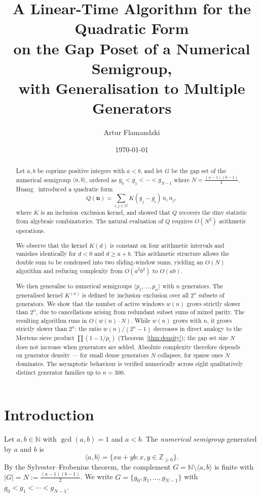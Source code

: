 \documentclass[11pt,a4paper]{amsart}
\title{A Linear-Time Algorithm for the Quadratic Form\\
on the Gap Poset of a Numerical Semigroup,\\
with Generalisation to Multiple Generators}
\author{Artur Flamandzki}
\date{\today}
\theoremstyle{plain}
\theoremstyle{definition}
\theoremstyle{remark}
\begin{document}
\begin{abstract}
Let $a, b$ be coprime positive integers with $a < b$, and let $G$ be the gap
set of the numerical semigroup $\langle a, b \rangle$, ordered as
$g_0 < g_1 < \cdots < g_{N-1}$ where $N = \tfrac{(a-1)(b-1)}{2}$.
Huang~\cite{Huang2026} introduced a quadratic form
\[
  Q(\mathbf{n}) = \sum_{i,j \in G} K(g_j - g_i)\, n_i\, n_j,
\]
where $K$ is an inclusion--exclusion kernel, and showed that $Q$ recovers
the $\mathrm{dinv}$ statistic from algebraic combinatorics.
The natural evaluation of $Q$ requires $O(N^2)$ arithmetic operations.

We observe that the kernel $K(d)$ is constant on four arithmetic intervals
and vanishes identically for $d < 0$ and $d \geq a+b$.
This arithmetic structure allows the double sum to be condensed into two
sliding-window sums, yielding an $O(N)$ algorithm and reducing complexity
from $O(a^2b^2)$ to $O(ab)$.

We then generalise to numerical semigroups $\langle p_1,\ldots,p_n\rangle$
with $n$ generators. The generalised kernel $K^{(n)}$ is defined by
inclusion--exclusion over all $2^n$ subsets of generators. We show that the
number of active windows $w(n)$ grows strictly slower than $2^n$, due to
cancellations arising from redundant subset sums of mixed parity. The
resulting algorithm runs in $O(w(n) \cdot N)$. While $w(n)$ grows with $n$,
it grows strictly slower than $2^n$: the ratio $w(n)/(2^n - 1)$ decreases in
direct analogy to the Mertens sieve product $\prod(1 - 1/p_i)$
(Theorem~\ref{thm:density}); the gap set size $N$ does not increase when
generators are added. Absolute complexity therefore depends on generator
density --- for small dense generators $N$ collapses, for sparse ones $N$
dominates. The asymptotic behaviour is verified numerically across eight
qualitatively distinct generator families up to $n = 300$.
\end{abstract}

\maketitle

\section{Introduction}
\label{sec:introduction}

Let $a, b \in \mathbb{N}$ with $\gcd(a,b) = 1$ and $a < b$.
The \emph{numerical semigroup} generated by $a$ and $b$ is
\[
  \langle a, b \rangle = \{ xa + yb : x, y \in \mathbb{Z}_{\geq 0} \}.
\]
By the Sylvester--Frobenius theorem, the complement
$G = \mathbb{N} \setminus \langle a, b \rangle$
is finite with $|G| = N := \tfrac{(a-1)(b-1)}{2}$.
We write $G = \{g_0, g_1, \ldots, g_{N-1}\}$ with $g_0 < g_1 < \cdots < g_{N-1}$.
\end{document}
